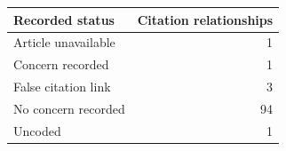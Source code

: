 \begin{tabular}{lr}
\toprule
Recorded status & Citation relationships \\
\midrule
Article unavailable & 1 \\
Concern recorded & 1 \\
False citation link & 3 \\
No concern recorded & 94 \\
Uncoded & 1 \\
\bottomrule
\end{tabular}
